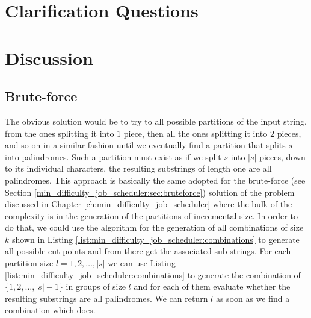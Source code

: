 \section{Clarification Questions}

\begin{QandA}
	\item \begin{questionitem} \begin{question}   \end{question} 	 
    \begin{answered}
		\textit{}
	\end{answered} \end{questionitem}
	
\end{QandA}

\section{Discussion}
\label{palindrome_partitioning2:sec:discussion}


\subsection{Brute-force}
\label{palindrome_partitioning2:sec:bruteforce}
The obvious solution would be to try to all possible partitions of the input string, from
the ones splitting it into $1$ piece, then all the ones splitting it into $2$ pieces, and so on in a
similar fashion until we eventually find a partition that splits $s$ into palindromes. Such a
partition must exist as if we split $s$ into $|s|$ pieces, down to its individual characters, the
resulting substrings of length one are all palindromes. This approach is basically the same adopted
for the brute-force (see Section \ref{min_difficulty_job_scheduler:sec:bruteforce}) solution of the
problem discussed in Chapter \ref{ch:min_difficulty_job_scheduler} where the bulk of the complexity
is in the generation of the partitions of incremental size. In order to do that, we could use the
algorithm for the generation of all combinations of size $k$ shown in Listing
\ref{list:min_difficulty_job_scheduler:combinations} to generate all possible cut-points and from
there get the associated sub-strings. For each partition size $l = 1,2,\ldots,|s|$ we can use
Listing \ref{list:min_difficulty_job_scheduler:combinations} to generate the combination of
$\{1,2,\ldots,|s|-1\}$ in groups of size $l$ and for each of them evaluate whether the resulting
substrings are all palindromes. We can return $l$ as soon as we find a combination which does.

